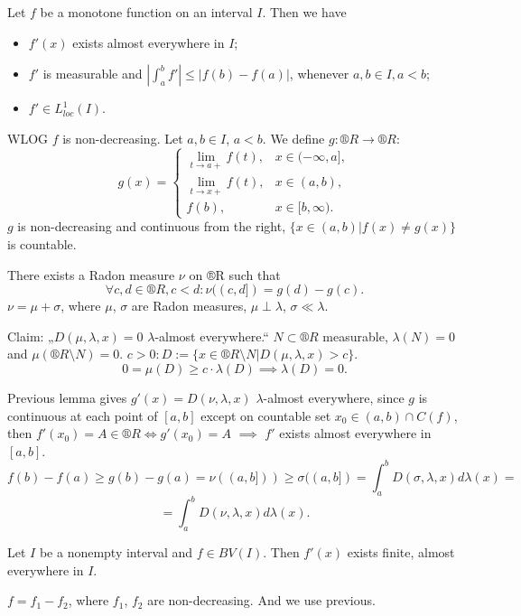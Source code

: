 \documentclass[12pt]{article}					%
\begin{document}
\begin{veta}[Lebesgue]
	Let $f$ be a monotone function on an interval $I$. Then we have

	\begin{itemize}
		\item $f'(x)$ exists almost everywhere in $I$;
		\item $f'$ is measurable and $|\int_a^b f'| ≤ |f(b) - f(a)|$, whenever $a, b \in I, a < b$;
		\item $f' \in L_{loc}^1(I)$.
	\end{itemize}

	\begin{dukazin}
		WLOG $f$ is non-decreasing. Let $a, b \in I$, $a < b$. We define $g: ®R \rightarrow ®R$:
		$$ g(x) = \begin{cases}\lim_{t \rightarrow a+} f(t), & x \in (-∞, a],\\ \lim_{t \rightarrow x+} f(t), & x \in (a, b),\\ f(b), & x \in [b, ∞).\end{cases} $$
		$g$ is non-decreasing and continuous from the right, $\{x \in (a, b) | f(x) ≠ g(x)\}$ is countable.

		There exists a Radon measure $\nu$ on ®R such that
		$$ \forall c, d \in ®R, c < d: \nu((c, d]) = g(d) - g(c). $$
		$\nu = \mu + \sigma$, where $\mu$, $\sigma$ are Radon measures, $\mu \perp \lambda$, $\sigma \ll \lambda$.

		Claim: „$D(\mu, \lambda, x) = 0$ $\lambda$-almost everywhere.“ $N \subset ®R$ measurable, $\lambda(N) = 0$ and $\mu(®R \setminus N) = 0$. $c > 0: D:= \{x \in ®R \setminus N | D(\mu, \lambda, x) > c\}$.
		$$ 0 = \mu(D) ≥ c·\lambda(D) \implies \lambda(D) = 0. $$

		Previous lemma gives $g'(x) = D(\nu, \lambda, x)$ $\lambda$-almost everywhere, since $g$ is continuous at each point of $[a, b]$ except on countable set $x_0 \in (a, b) \cap C(f)$, then $f'(x_0) = A \in ®R \Leftrightarrow g'(x_0) = A$ $\implies$ $f'$ exists almost everywhere in $[a, b]$.
		$$ f(b) - f(a) ≥ g(b) - g(a) = \nu((a, b])) ≥ \sigma((a, b]) = \int_a^b D(\sigma, \lambda, x) d\lambda(x) = $$
		$$ = \int_a^b D(\nu, \lambda, x) d\lambda(x). $$
	\end{dukazin}
\end{veta}

\begin{veta}
	Let $I$ be a nonempty interval and $f \in BV(I)$. Then $f'(x)$ exists finite, almost everywhere in $I$.

	\begin{dukazin}
		$f = f_1 - f_2$, where $f_1$, $f_2$ are non-decreasing. And we use previous.
	\end{dukazin}
\end{veta}
\end{document}
